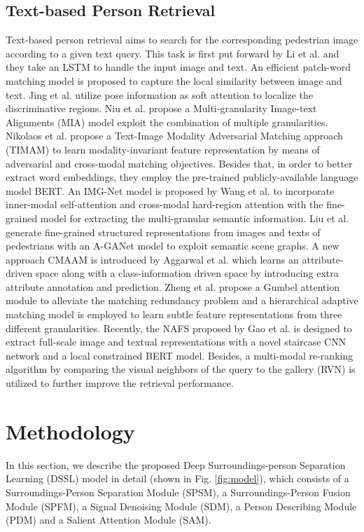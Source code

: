 \documentclass[sigconf]{acmart}
\begin{document}
\subsection{Text-based Person Retrieval}
Text-based person retrieval aims to search for the corresponding pedestrian image according to a given text query. This task is first put forward by Li et al. \cite{Shuang2017Person} and they take an LSTM to handle the input image and text. An efficient patch-word matching model \cite{Chen2018} is proposed to capture the local similarity between image and text. Jing et al. \cite{Jing2018Pose} utilize pose information as soft attention to localize the discriminative regions. Niu et al. \cite{niu2020improving} propose a Multi-granularity Image-text Alignments (MIA) model exploit the combination of multiple granularities. Nikolaos et al. \cite{ARL} propose a Text-Image Modality Adversarial Matching approach (TIMAM) to learn modality-invariant feature representation by means of adversarial and cross-modal matching objectives. Besides that, in order to better extract word embeddings, they employ the pre-trained publicly-available language model BERT. An IMG-Net model is proposed by Wang et al. \cite{wang2020img} to incorporate inner-modal self-attention and cross-modal hard-region attention with the fine-grained model for extracting the multi-granular semantic information. Liu et al. \cite{mm2019graphreid} generate fine-grained structured representations from images and texts of pedestrians with an A-GANet model to exploit semantic scene graphs. A new approach CMAAM is introduced by Aggarwal et al. \cite{aggarwal2020text} which learns an attribute-driven space along with a class-information driven space by introducing extra attribute annotation and prediction. Zheng et al. \cite{zheng2020hierarchical} propose a Gumbel attention module to alleviate the matching redundancy problem and a hierarchical adaptive matching model is employed to learn subtle feature representations from three different granularities. Recently, the NAFS proposed by Gao et al. \cite{gao2021contextual} is designed to extract full-scale image and textual representations with a novel staircase CNN network and a local constrained BERT model. Besides, a multi-modal re-ranking algorithm by comparing the visual neighbors of the query to the gallery (RVN) is utilized to further improve the retrieval performance.

\section{Methodology}
In this section, we describe the proposed Deep Surroundings-person Separation Learning (DSSL) model in detail (shown in Fig. \ref{fig:model}), which consists of a Surroundings-Person Separation Module (SPSM), a Surroundings-Person Fusion Module (SPFM), a Signal Denoising Module (SDM), a Person Describing Module (PDM) and a Salient Attention Module (SAM).
\end{document}

